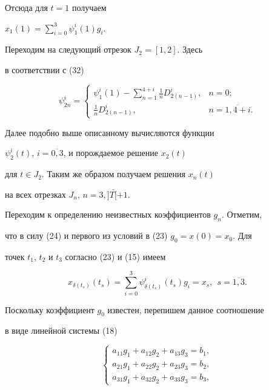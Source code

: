 Отсюда для $t=1$ получаем


$x_1(1)=\sum\limits_{i=0}^{3}\psi_1^i(1)g_i$. 


Переходим на следующий отрезок $J_2=[1,2]$. Здесь


в соответствии с (32)


$$


\psi_{2n}^i=


\begin{cases}


\psi_{1}^i(1)-\sum\limits_{n=1}^{4+i}\frac{1}{n}D_{2(n-1)}^i,


& n=0;\\


\frac{1}{n}D_{2(n-1)}^i, & n=\overline{1,4+i}.


\end{cases}


$$


Далее подобно выше описанному вычисляются функции


$\psi_2^i(t)$, $i=\overline{0,3}$, и порождаемое решение $x_2(t)$


для $t\in J_2$. Таким же образом получаем решения $x_n(t)$


на всех отрезках $J_n$, $n=\overline{3,]T[+1}$.





Переходим к определению неизвестных коэффициентов $g_n$. Отметим,


что в силу (24) и первого из условий в (23) $g_0=x(0)=x_0$. Для


точек $t_1$, $t_2$ и $t_3$ согласно (23) и (15) имеем


$$


x_{\delta(t_s)}(t_s)=\sum_{i=0}^3


\psi_{\delta(t_s)}^i(t_s)g_i=x_s,\ \ s=\overline{1,3}.


$$


Поскольку коэффициент $g_0$ известен, перепишем данное соотношение


в виде линейной системы (18)


\begin{equation}


\begin{cases}


a_{11}g_1+a_{12}g_2+a_{13}g_3 = b_1,\\


a_{21}g_1+a_{22}g_2+a_{23}g_3 = b_2,\\


a_{31}g_1+a_{32}g_2+a_{33}g_3 = b_3,


\end{cases}


\end{equation}


